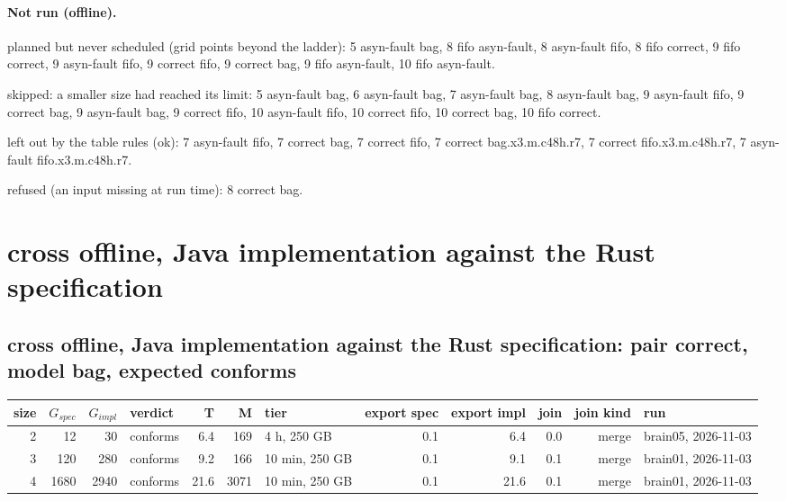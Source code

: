 \documentclass[10pt]{article}
\begin{document}
\paragraph{Not run (offline).}
planned but never scheduled (grid points beyond the ladder): 5 asyn-fault bag, 8 fifo asyn-fault, 8 asyn-fault fifo, 8 fifo correct, 9 fifo correct, 9 asyn-fault fifo, 9 correct fifo, 9 correct bag, 9 fifo asyn-fault, 10 fifo asyn-fault.\par
skipped: a smaller size had reached its limit: 5 asyn-fault bag, 6 asyn-fault bag, 7 asyn-fault bag, 8 asyn-fault bag, 9 asyn-fault fifo, 9 correct bag, 9 asyn-fault bag, 9 correct fifo, 10 asyn-fault fifo, 10 correct fifo, 10 correct bag, 10 fifo correct.\par
left out by the table rules (ok): 7 asyn-fault fifo, 7 correct bag, 7 correct fifo, 7 correct bag.x3.m.c48h.r7, 7 correct fifo.x3.m.c48h.r7, 7 asyn-fault fifo.x3.m.c48h.r7.\par
refused (an input missing at run time): 8 correct bag.\par
\section*{cross offline, Java implementation against the Rust specification}
\subsection*{cross offline, Java implementation against the Rust specification: pair \textsf{correct}, model bag, expected conforms}
\begin{longtable}{@{}rrrlrrlrrrrl@{}}
\toprule
size & $G_{\mathit{spec}}$ & $G_{\mathit{impl}}$ & verdict & T & M & tier & export spec & export impl & join & join kind & run \\
\midrule
\endhead
\color{blue} 2 & 12 & 30 & conforms & 6.4 & 169 & 4 h, 250 GB & 0.1 & 6.4 & 0.0 & merge & brain05, 2026-11-03 \\
\color{blue} 3 & 120 & 280 & conforms & 9.2 & 166 & 10 min, 250 GB & 0.1 & 9.1 & 0.1 & merge & brain01, 2026-11-03 \\
\color{blue} 4 & 1680 & 2940 & conforms & 21.6 & 3071 & 10 min, 250 GB & 0.1 & 21.6 & 0.1 & merge & brain01, 2026-11-03 \\
\bottomrule
\end{longtable}
\end{document}

